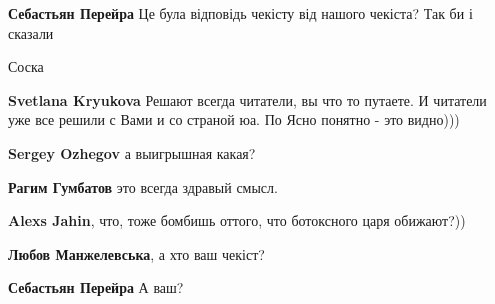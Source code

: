 \begin{itemize}
\begin{itemize}
 
\textbf{Себастьян Перейра} Це була відповідь чекісту від нашого чекіста? Так би і сказали

 
Соска🤣

 
\textbf{Svetlana Kryukova} Решают всегда читатели, вы что то путаете. И читатели уже все решили с Вами и со страной юа. По Ясно понятно - это видно)))

 
\textbf{Sergey Ozhegov} а выигрышная какая?

 
\textbf{Рагим Гумбатов} это всегда здравый смысл.

 
\textbf{Alexs Jahin}, что, тоже бомбишь оттого, что ботоксного царя обижают?))

 
\textbf{Любов Манжелевська}, а хто ваш чекіст?

 
\textbf{Себастьян Перейра} А ваш?

 

\end{itemize}
\end{itemize}
